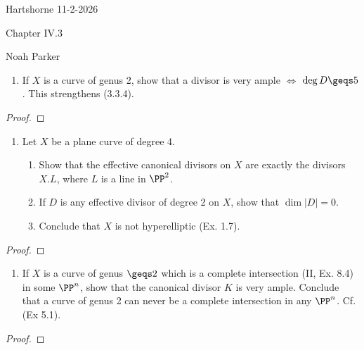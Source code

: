 \documentclass[12pt]{amsart}
\begin{document}
{Hartshorne} \hfill {11-2-2026}

\bigskip\bigskip

\begin{center}

{\sc Chapter IV.3}

\end{center}

\begin{center}

  {Noah Parker} 
    
\end{center}

\bigskip\bigskip

\begin{enumerate}
	\item[1.] {
      If $X$ is a curve of genus 2, show that a divisor is very ample $\iff$ $\deg D\geqs 5$.
      This strengthens (3.3.4).
    }
\end{enumerate} 

\begin{proof}
\end{proof}

\begin{enumerate}
	\item[2.] {
      Let $X$ be a plane curve  of degree 4.
      \begin{enumerate}
        \item Show that the effective canonical divisors on $X$ are exactly the divisors $X.L$, where $L$ is a line in $\PP^2$.
        \item If $D$ is any effective divisor of degree 2 on $X$, show that $\dim|D|=0$.
        \item Conclude that $X$ is not hyperelliptic (Ex. 1.7).
      \end{enumerate}
    }
\end{enumerate}

\begin{proof}
\end{proof}

\begin{enumerate}
	\item[3.] {
      If $X$ is a curve of genus $\geqs 2$ which is a complete intersection (II, Ex. 8.4) in some $\PP^n$, show that the canonical divisor $K$ is very ample.
      Conclude that a curve of genus 2 can never be a complete intersection in any $\PP^n$. Cf. (Ex 5.1).
    }
\end{enumerate}

\begin{proof}
\end{proof}
\end{document}
